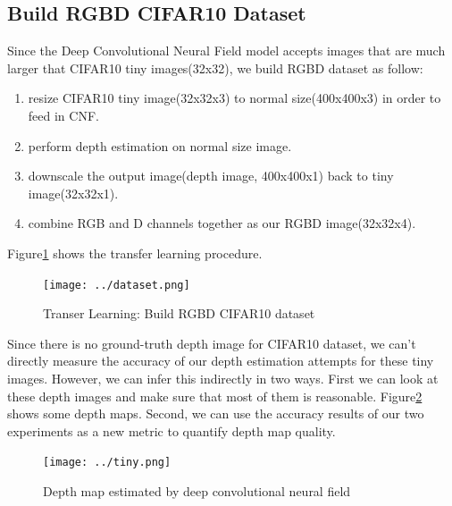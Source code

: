 \documentclass[10pt,twocolumn,letterpaper]{article}
\begin{document}
\subsection{Build RGBD CIFAR10 Dataset}
Since the Deep Convolutional Neural Field model accepts images that are 
much larger that CIFAR10 tiny images(32x32), we build RGBD dataset as follow:
\begin{enumerate}
\item resize CIFAR10 tiny image(32x32x3) to normal size(400x400x3) in order to 
feed in CNF.
\item perform depth estimation on normal size image.
\item downscale the output image(depth image, 400x400x1) back to tiny 
image(32x32x1).
\item combine RGB and D channels together as our RGBD image(32x32x4).
\end{enumerate}
Figure\ref{fig:dataset} shows the transfer learning procedure.
\begin{figure}
\texttt{[image: ../dataset.png]}
\caption{Transer Learning: Build RGBD CIFAR10 dataset}
\label{fig:dataset}
\end{figure}
Since there is no ground-truth depth image for CIFAR10 dataset, we can\rq{}t directly 
measure the accuracy of our depth estimation attempts for these tiny images. 
However, we can infer this indirectly in two ways.
First we can look at these depth images
and make sure that most of them is reasonable.
Figure\ref{fig:tiny} shows some depth maps.
Second, we can use the accuracy results of our two experiments as a new metric to 
quantify depth map quality.
\begin{figure}
\texttt{[image: ../tiny.png]}
\caption{Depth map estimated by deep convolutional neural field}
\label{fig:tiny}
\end{figure}
\end{document}
